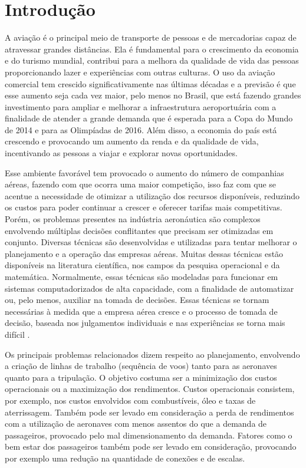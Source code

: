 \chapter{Introdução}
  
 A aviação é o principal meio de transporte de pessoas e de mercadorias capaz
 de atravessar grandes distâncias. Ela é fundamental para o crescimento
 da economia e do turismo mundial, contribui para a melhora da qualidade
 de vida das pessoas proporcionando lazer e experiências com outras culturas. O
 uso da aviação comercial tem crescido significativamente nas últimas décadas e
 a previsão é que esse aumento seja cada vez maior, pelo menos no Brasil, que
 está fazendo grandes investimento para ampliar e melhorar a infraestrutura
 aeroportuária com a finalidade de atender a grande demanda que é esperada para
 a Copa do Mundo de 2014 e para as Olimpíadas de 2016. Além disso, a economia do
 país está crescendo e provocando um aumento da renda e da qualidade de vida,
 incentivando as pessoas a viajar e explorar novas oportunidades.

  	
Esse ambiente favorável tem provocado o aumento do número de companhias
aéreas, fazendo com que ocorra uma maior competição, isso faz com que
se acentue a necessidade de otimizar a utilização dos recursos disponíveis,
reduzindo os custos para poder continuar a crescer e oferecer tarifas mais competitivas.
Porém, os problemas presentes na indústria aeronáutica são complexos envolvendo
múltiplas decisões conflitantes que precisam ser otimizadas em conjunto.
Diversas técnicas são desenvolvidas e utilizadas para tentar melhorar o
planejamento e a operação das empresas aéreas. Muitas dessas técnicas estão
disponíveis na literatura científica, nos campos da pesquisa operacional e da
matemática. Normalmente, essas técnicas são modeladas para funcionar em sistemas
computadorizados de alta capacidade, com a finalidade de automatizar ou, pelo
menos, auxiliar na tomada de decisões. Essas técnicas se tornam
necessárias à medida que a empresa aérea cresce e o processo de tomada de
decisão, baseada nos julgamentos individuais e nas experiências se torna mais
difícil \cite{ahmed2009}.
  	
  	
Os principais problemas relacionados dizem respeito ao planejamento, envolvendo
a criação de linhas de trabalho (sequência de voos) tanto para as aeronaves
quanto para a tripulação. O objetivo costuma ser a minimização dos custos operacionais ou a
maximização dos rendimentos. Custos operacionais consistem, por exemplo, nos
custos envolvidos com combustíveis, óleo e taxas de aterrissagem. Também pode
ser levado em consideração a perda de rendimentos com a utilização de aeronaves
com menos assentos do que a demanda de passageiros, provocado pelo mal
dimensionamento da demanda. Fatores como o bem estar dos passageiros também pode
ser levado em consideração, provocando por exemplo uma redução na quantidade de
conexões e de escalas.
	
